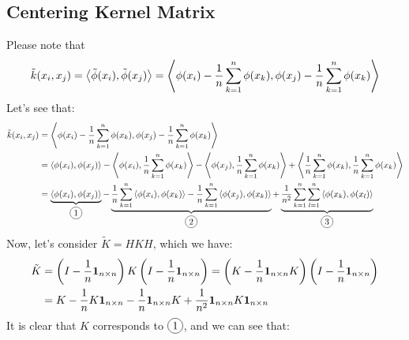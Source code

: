 \subsection{Centering Kernel Matrix}
\label{appendix:kernel-pca-centering}
Please note that 
\begin{equation*}
    \tilde{k}(x_i, x_j) = \left\langle \tilde{\phi}(x_i), \tilde{\phi}(x_j) \right\rangle = \left\langle \phi(x_i) - \frac{1}{n}\sum^n_{k=1}\phi(x_k), \phi(x_j) - \frac{1}{n}\sum^n_{k=1}\phi(x_k) \right\rangle
\end{equation*}
Let's see that:
\begin{equation*}
\begin{aligned}
    \tilde{k}(x_i, x_j) &= \brackd{\phi(x_i) - \frac{1}{n}\sum^n_{k=1}\phi(x_k), \phi(x_j) - \frac{1}{n}\sum^n_{k=1}\phi(x_k)} \\ 
    &= \brackd{\phi(x_i), \phi(x_j)} - \brackd{\phi(x_i), \frac{1}{n}\sum^n_{k=1}\phi(x_k) } - \brackd{\phi(x_j), \frac{1}{n}\sum^n_{k=1}\phi(x_k)} + \brackd{\frac{1}{n}\sum^n_{k=1}\phi(x_k), \frac{1}{n}\sum^n_{k=1}\phi(x_k)}\\
    &= \underbrace{\brackd{\phi(x_i), \phi(x_j)}}_{\circled{1}} - \underbrace{\frac{1}{n}\sum^n_{k=1}\brackd{\phi(x_i),\phi(x_k)} - \frac{1}{n}\sum^n_{k=1}\brackd{\phi(x_j), \phi(x_k)}}_{\circled{2}} + \underbrace{\frac{1}{n^2} \sum^n_{k=1}\sum^n_{l=1}\brackd{\phi(x_k), \phi(x_l)}}_{\circled{3}}
\end{aligned}
\end{equation*}
Now, let's consider $\tilde{K} = HKH$, which we have:
\begin{equation*}
\begin{aligned}
    \tilde{K} &= \left( I - \frac{1}{n}\boldsymbol 1_{n\times n} \right)K\left( I - \frac{1}{n}\boldsymbol 1_{n\times n} \right) = \left( K- \frac{1}{n}\boldsymbol{1}_{n\times n}K  \right)\left( I - \frac{1}{n}\boldsymbol{1}_{n\times n} \right) \\
    &= K-\frac{1}{n}K\boldsymbol{1}_{n\times n} - \frac{1}{n}\boldsymbol{1}_{n\times n}K + \frac{1}{n^2}\boldsymbol{1}_{n\times n}K\boldsymbol{1}_{n\times n}
\end{aligned}
\end{equation*}
It is clear that $K$ corresponds to $\circled{1}$, and we can see that:
